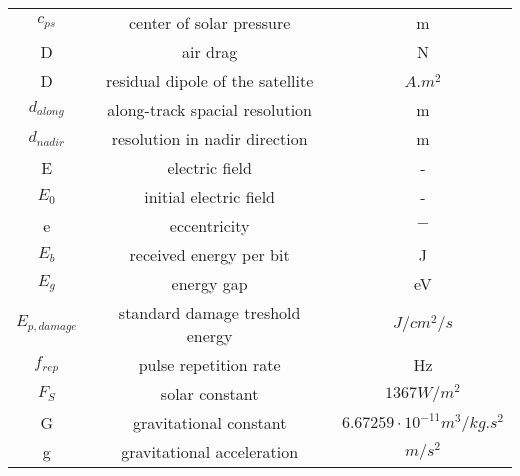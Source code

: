 \begin{center}
\begin{longtable}{c|c|c}
$c_{ps}$                            & center of solar pressure                   															& m \\

D																		& air drag 																																& N \\

D                                		& residual dipole of the satellite               													& $A.m^2$ \\

$d_{along}$                       	& along-track spacial resolution                  												& m \\

$d_{nadir}$                         & resolution in nadir direction                 													& m \\

E																		& electric field																													& - \\

$E_0$																& initial electric field																									& - \\

e 																	& eccentricity 																														& $-$ \\

$E_b$                               & received energy per bit                  																& J \\

$E_g$                               & energy gap                                 															& eV \\

$E_{p,damage}$                      & standard damage treshold energy            															& $J/cm^2/s$ \\

$f_{rep}$                     			& pulse repetition rate                   																& Hz \\

$F_S$                           		& solar constant                            															& $1367 W/m^2$ \\

G                                   & gravitational constant                      														& $6.67259\cdot 10^{-11} m^3/{kg.s^2}$ \\

g 																	& gravitational acceleration 																							& $m/s^2$ \\


\end{longtable}
\end{center}
